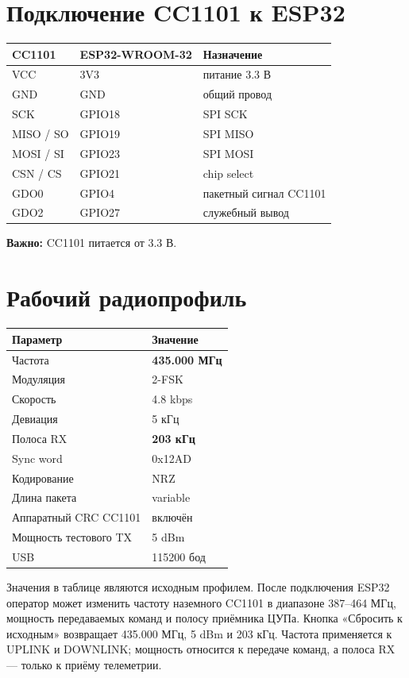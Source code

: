 \documentclass[11pt,a4paper]{article}
\begin{document}
\section{Подключение CC1101 к ESP32}

\begin{center}
\begin{tabular}{lll}
\toprule
\textbf{CC1101} & \textbf{ESP32-WROOM-32} & \textbf{Назначение}\\
\midrule
VCC & 3V3 & питание 3.3 В\\
GND & GND & общий провод\\
SCK & GPIO18 & SPI SCK\\
MISO / SO & GPIO19 & SPI MISO\\
MOSI / SI & GPIO23 & SPI MOSI\\
CSN / CS & GPIO21 & chip select\\
GDO0 & GPIO4 & пакетный сигнал CC1101\\
GDO2 & GPIO27 & служебный вывод\\
\bottomrule
\end{tabular}
\end{center}

\textbf{Важно:} CC1101 питается от 3.3 В.

\section{Рабочий радиопрофиль}

\begin{center}
\begin{tabular}{ll}
\toprule
Параметр & Значение\\
\midrule
Частота & \textbf{435.000 МГц}\\
Модуляция & 2-FSK\\
Скорость & 4.8 kbps\\
Девиация & 5 кГц\\
Полоса RX & \textbf{203 кГц}\\
Sync word & 0x12AD\\
Кодирование & NRZ\\
Длина пакета & variable\\
Аппаратный CRC CC1101 & включён\\
Мощность тестового TX & 5 dBm\\
USB & 115200 бод\\
\bottomrule
\end{tabular}
\end{center}

Значения в таблице являются исходным профилем. После подключения ESP32 оператор может изменить частоту наземного CC1101 в диапазоне 387--464 МГц, мощность передаваемых команд и полосу приёмника ЦУПа. Кнопка «Сбросить к исходным» возвращает 435.000 МГц, 5 dBm и 203 кГц. Частота применяется к UPLINK и DOWNLINK; мощность относится к передаче команд, а полоса RX --- только к приёму телеметрии.
\end{document}
